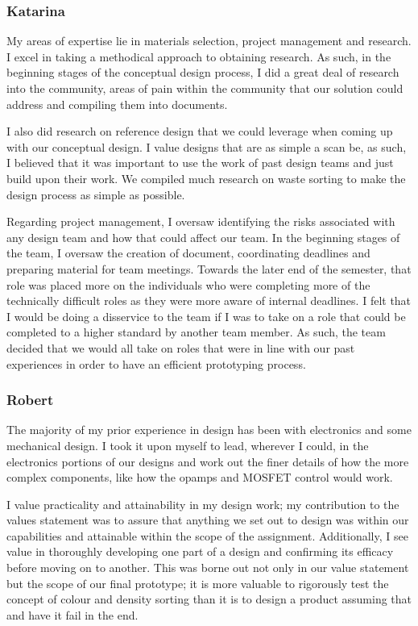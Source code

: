 \documentclass[12pt]{article}
\begin{document}
\begin{multicols*}{2}
            \subsubsection{Katarina}
                My areas of expertise lie in materials selection, project management and research. I excel in taking a methodical approach to obtaining research. As such, in the beginning stages of the conceptual design process, I did a great deal of research into the community, areas of pain within the community that our solution could address and compiling them into documents. 
            
                I also did research on reference design that we could leverage when coming up with our conceptual design.  I value designs that are as simple a scan be, as such, I believed that it was important to use the work of past design teams and just build upon their work. We compiled much research on waste sorting to make the design process as simple as possible. 
            
                Regarding project management, I oversaw identifying the risks associated with any design team and how that could affect our team. In the beginning stages of the team, I oversaw the creation of document, coordinating deadlines and preparing material for team meetings. Towards the later end of the semester, that role was placed more on the individuals who were completing more of the technically difficult roles as they were more aware of internal deadlines. I felt that I would be doing a disservice to the team if I was to take on a role that could be completed to a higher standard by another team member. As such, the team decided that we would all take on roles that were in line with our past experiences in order to have an efficient prototyping process.

            \subsubsection{Robert}
                The majority of my prior experience in design has been with electronics and some mechanical design. I took it upon myself to lead, wherever I could, in the electronics portions of our designs and work out the finer details of how the more complex components, like how the opamps and MOSFET control would work.

                I value practicality and attainability in my design work; my contribution to the values statement was to assure that anything we set out to design was within our capabilities and attainable within the scope of the assignment. Additionally, I see value in thoroughly developing one part of a design and confirming its efficacy before moving on to another. This was borne out not only in our value statement but the scope of our final prototype; it is more valuable to rigorously test the concept of colour and density sorting than it is to design a product assuming that and have it fail in the end. 


\end{multicols*}
\end{document}
